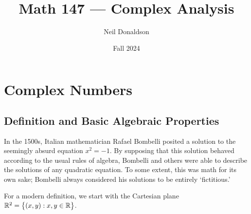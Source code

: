 \graphicspath{{1complex/asy/}}
\thispagestyle{empty}

\title{Math 147 --- Complex Analysis}
\author{Neil Donaldson}
\date{Fall 2024}
\maketitle	

\section{Complex Numbers}\label{chap:complex}

\subsection[Definition and Basic Algebraic Properties]{Definition and Basic Algebraic Properties%
}

In the 1500s, Italian mathematician Rafael Bombelli posited a solution to the seemingly absurd equation $x^2=-1$. By supposing that this solution behaved according to the usual rules of algebra, Bombelli and others were able to describe the solutions of any quadratic equation. To some extent, this was math for its own sake; Bombelli always considered his solutions to be entirely `fictitious.'\medbreak

For a modern definition, we start with the Cartesian plane $\mathbb{R}^2=\bigl\{(x,y):x,y\in\mathbb{R}\bigr\}$.

